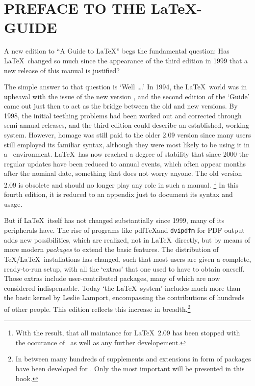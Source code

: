 \documentclass{article}
\begin{document}
\section*{PREFACE TO THE \LaTeX-GUIDE}

A new edition to ``A Guide to \LaTeX'' begs the fundamental question:
Has \LaTeX\ changed so much since the appearance of the third edition in 1999
that a new release of this manual is justified?

The simple answer to that question is `Well \dots.' In 1994, the \LaTeX\
world was in upheaval with the issue of the new version \LaTeXe, and the
second edition of the `Guide' came out just then to act as the bridge
between the old and new versions. By 1998, the initial teething problems had
been worked out and corrected through semi-annual releases, and the third
edition could describe an established, working system. However, homage was
still paid to the older 2.09 version since many users still employed its
familiar syntax, although they were most likely to be using it in a \LaTeXe\
environment. \LaTeX\ has now reached a degree of stability that since 2000
the regular updates have been reduced to annual events, which often appear
months after the nominal date, something that does not worry anyone. The old
version 2.09 is obsolete and should no longer play any role in such a manual.%
\footnote{With the result, that all maintance for \LaTeX\ 2.09 has been stopped
with the occurance of \LaTeXe\ as well as any further developement.}
In this fourth edition, it is reduced to an appendix just to document its
syntax and usage.

But if \LaTeX\ itself has not changed substantially since 1999, many of its
peripherals have. The rise of programs like pdf\TeX  and \texttt{dvipdfm} for
PDF output adds new possibilities, which are realized, not in \LaTeX\
directly, but by means of more modern \emph{packages} to extend the basic
features. The distribution of \TeX/\LaTeX\ installations has changed, such
that most users are given a complete, ready-to-run setup, with all the
`extras' that one used to have to obtain oneself. Those extras include
user-contributed packages, many of which are now considered indispensable.
Today `the \LaTeX\ system' includes much more than the basic kernel by Leslie
Lamport, encompassing the contributions of hundreds of other people. This
edition reflects this increase in breadth.\footnote{In between many hundreds
of supplements and extensions in form of packages have been developed for
\LaTeXe. Only the most important will be presented in this book.}
\end{document}
